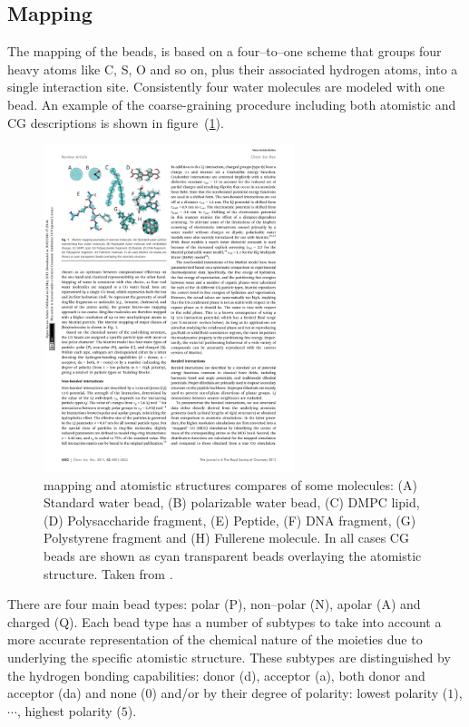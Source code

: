 \subsection{Mapping}
The mapping of the \martini beads, is based on a four--to--one scheme that groups four heavy atoms like C, S, O and so on, plus their associated hydrogen atoms, into a single interaction site. Consistently four water molecules are modeled with one \martini bead. An example of the coarse-graining procedure including both atomistic and \ac{CG} descriptions is shown in figure~(\ref{fig:martiniMapping}).
\begin{figure}[!ht]
	\centering
	\includegraphics[width=0.65\textwidth]{img/martiniMapping.pdf}
	\caption{\martini mapping and atomistic structures compares of some molecules: (A) Standard water bead, (B) polarizable water bead, (C) \acs{DMPC} lipid, (D) Polysaccharide fragment, (E) Peptide, (F) \acs{DNA} fragment, (G) Polystyrene fragment and (H) Fullerene molecule. In all cases \martini \acs{CG} beads are shown as cyan transparent beads overlaying the atomistic structure. Taken from \cite{MartiniReview}.}
	\label{fig:martiniMapping}
\end{figure}

There are four main bead types: polar (P), non--polar (N), apolar (A) and charged (Q). Each bead type has a number of subtypes to take into account a more accurate representation of the chemical nature of the moieties due to underlying the specific atomistic structure. These subtypes are distinguished by the hydrogen bonding capabilities: donor (d), acceptor (a), both donor and acceptor (da) and none ($0$) and/or by their degree of polarity: lowest polarity ($1$), $\cdots$, highest polarity ($5$).

